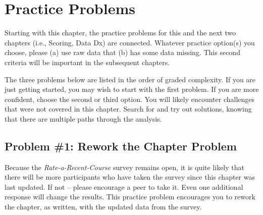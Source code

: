 \documentclass[
]{book}
\begin{document}
\hypertarget{practice-problems}{%
\section{Practice Problems}\label{practice-problems}}

Starting with this chapter, the practice problems for this and the next two chapters (i.e., Scoring, Data Dx) are connected. Whatever practice option(s) you choose, please (a) use raw data that (b) has some data missing. This second criteria will be important in the subsequent chapters.

The three problems below are listed in the order of graded complexity. If you are just getting started, you may wish to start with the first problem. If you are more confident, choose the second or third option. You will likely encounter challenges that were not covered in this chapter. Search for and try out solutions, knowing that there are multiple paths through the analysis.

\hypertarget{problem-1-rework-the-chapter-problem}{%
\subsection{Problem \#1: Rework the Chapter Problem}\label{problem-1-rework-the-chapter-problem}}

Because the \emph{Rate-a-Recent-Course} survey remains open, it is quite likely that there will be more participants who have taken the survey since this chapter was last updated. If not -- please encourage a peer to take it. Even one additional response will change the results. This practice problem encourages you to rework the chapter, as written, with the updated data from the survey.
\end{document}
